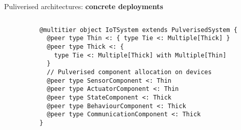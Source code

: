 \begin{frame}[fragile]{Puliverised architectures: \textbf{concrete deployments}}
  \begin{columns}

    \begin{column}{0.3\textwidth}
    \end{column}
    \begin{column}{0.7\textwidth}
      \begin{cardTiny}
        \begin{verbatim}
@multitier object IoTSystem extends PulverisedSystem {
  @peer type Thin <: { type Tie <: Multiple[Thick] }
  @peer type Thick <: { 
    type Tie <: Multiple[Thick] with Multiple[Thin]
  }
  // Pulverised component allocation on devices
  @peer type SensorComponent <: Thin
  @peer type ActuatorComponent <: Thin
  @peer type StateComponent <: Thick
  @peer type BehaviourComponent <: Thick
  @peer type CommunicationComponent <: Thick
}
        \end{verbatim}
      \end{cardTiny}
    \end{column}
  \end{columns}
\end{frame}